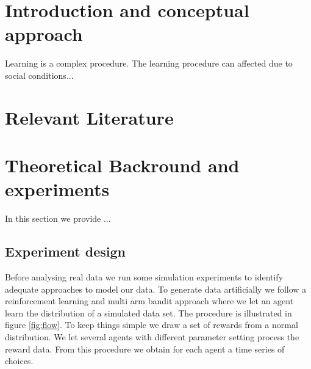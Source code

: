 \documentclass[12pt,a4paper,bibliography=totocnumbered,listof=totocnumbered]{scrartcl}
\begin{document}



\section{Introduction and conceptual approach}

Learning is a complex procedure. The learning procedure can affected due to social conditions... 


\pagebreak

\section{Relevant Literature}


\pagebreak

\section{Theoretical Backround and experiments}

In this section we provide ... 

\subsection{Experiment design}

Before analysing real data we run some simulation experiments to identify adequate approaches to model our data. To generate data artificially we follow a reinforcement learning and multi arm bandit approach where we let an agent learn the distribution of a simulated data set. The procedure is illustrated in figure \ref{fig:flow}. To keep things simple we draw a set of rewards from a normal distribution. We let several agents with different parameter setting process the reward data. From this procedure we obtain for each agent a time series of choices. 
\end{document}

